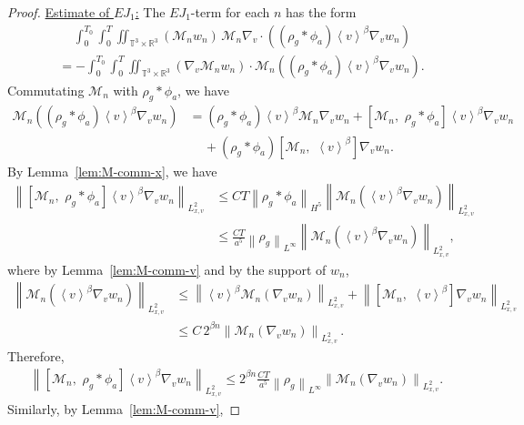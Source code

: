 \documentclass[11pt,american, reqno]{amsart}
\numberwithin{equation}{section}
\newcommand{\R}{\mathbb R}
\newcommand{\1}{\mathds{1}}
\newcommand{\Ni}{\noindent}
\newcommand{\CalM}{\mathcal{M}}
\newcommand{\vpran}[1]{\left(#1\right)}
\newcommand{\norm}[1]{\left\lVert#1\right\rVert}
\newcommand{\vint}[1]{\left\langle#1\right\rangle}
\newcommand{\T}{\mathbb{T}}
\numberwithin{equation}{section}
\begin{document}
\begin{proof}
\smallskip

\Ni \underline{Estimate of $EJ_1$:} The $EJ_1$-term for each $n$ has the form
\begin{align*}
& \quad \,
 \int_0^{T_0} \int_0^T \iint_{\T^3 \times \R^3}
   \vpran{\CalM_n w_n} \,
\CalM_n \nabla_v \cdot \vpran{\vpran{\rho_g \ast \phi_a} \vint{v}^\beta \nabla_v w_n}
\\
& = - \int_0^{T_0} \int_0^T \iint_{\T^3 \times \R^3}
   \vpran{\nabla_v \CalM_n w_n} \cdot
\CalM_n \vpran{\vpran{\rho_g \ast \phi_a} \vint{v}^\beta \nabla_v w_n}. 
\end{align*}
Commutating $\CalM_n$ with $\rho_g \ast \phi_a$, we have
\begin{align*}
  \CalM_n \vpran{\vpran{\rho_g \ast \phi_a} \vint{v}^\beta \nabla_v w_n}
&= \vpran{\rho_g \ast \phi_a} \vint{v}^\beta \CalM_n \nabla_v w_n
+ [\CalM_n, \,\, \rho_g \ast \phi_a]
  \vint{v}^\beta \nabla_v w_n
\\
& \quad \,
+ \vpran{\rho_g \ast \phi_a} [\CalM_n, \,\, \vint{v}^\beta] \nabla_v w_n. 
\end{align*}
By Lemma~\ref{lem:M-comm-x}, we have 
\begin{align*}
 \norm{[\CalM_n, \,\, \rho_g \ast \phi_a]
  \vint{v}^\beta \nabla_v w_n}_{L^2_{x, v}}
&\leq
 C T \norm{\rho_g \ast \phi_a}_{H^5}
 \norm{\CalM_n \vpran{\vint{v}^\beta \nabla_v w_n}}_{L^2_{x, v}}
\\
&\leq
 \frac{C T}{a^5} \norm{\rho_g}_{L^\infty} 
 \norm{\CalM_n \vpran{\vint{v}^\beta \nabla_v w_n}}_{L^2_{x, v}}, 
\end{align*}
where by Lemma~\ref{lem:M-comm-v} and by the support of $w_n$,
\begin{align*}
 \norm{\CalM_n \vpran{\vint{v}^\beta \nabla_v w_n}}_{L^2_{x, v}}
&\leq 
 \norm{\vint{v}^\beta \CalM_n \vpran{\nabla_v w_n}}_{L^2_{x, v}}
+  \norm{[\CalM_n, \,\, \vint{v}^\beta] \nabla_v w_n}_{L^2_{x, v}}
\\
&\leq 
 C\, 2^{\beta n} 
 \norm{\CalM_n \vpran{\nabla_v w_n}}_{L^2_{x, v}}\,.
\end{align*}
Therefore,
\begin{align} \label{est:toy-comm-J-1-1}
 \norm{[\CalM_n, \,\, \rho_g \ast \phi_a]
  \vint{v}^\beta \nabla_v w_n}_{L^2_{x, v}}
\leq
 2^{\beta n} 
 \frac{C T}{a^5} \norm{\rho_g}_{L^\infty} 
 \norm{\CalM_n \vpran{\nabla_v w_n}}_{L^2_{x, v}}.
\end{align}
Similarly, by Lemma~\ref{lem:M-comm-v}, 

\end{proof}
\end{document}
